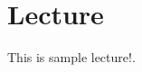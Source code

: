 \documentclass[../index.tex]{subfiles}
\begin{document}
    \section{Lecture}
    \begin{center}
        This is sample lecture!.
    \end{center}
\end{document}
